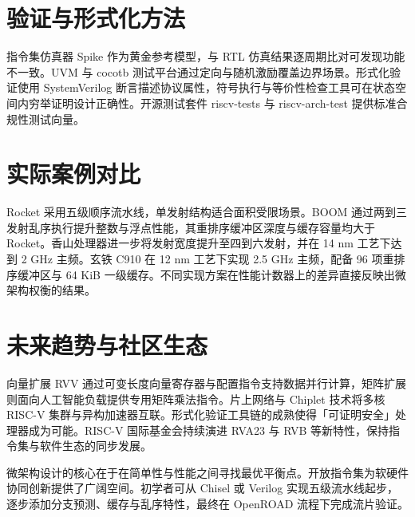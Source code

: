 \chapter{验证与形式化方法}
指令集仿真器 Spike 作为黄金参考模型，与 RTL 仿真结果逐周期比对可发现功能不一致。UVM 与 cocotb 测试平台通过定向与随机激励覆盖边界场景。形式化验证使用 SystemVerilog 断言描述协议属性，符号执行与等价性检查工具可在状态空间内穷举证明设计正确性。开源测试套件 riscv-tests 与 riscv-arch-test 提供标准合规性测试向量。\par
\chapter{实际案例对比}
Rocket 采用五级顺序流水线，单发射结构适合面积受限场景。BOOM 通过两到三发射乱序执行提升整数与浮点性能，其重排序缓冲区深度与缓存容量均大于 Rocket。香山处理器进一步将发射宽度提升至四到六发射，并在 14 nm 工艺下达到 2 GHz 主频。玄铁 C910 在 12 nm 工艺下实现 2.5 GHz 主频，配备 96 项重排序缓冲区与 64 KiB 一级缓存。不同实现方案在性能计数器上的差异直接反映出微架构权衡的结果。\par
\chapter{未来趋势与社区生态}
向量扩展 RVV 通过可变长度向量寄存器与配置指令支持数据并行计算，矩阵扩展则面向人工智能负载提供专用矩阵乘法指令。片上网络与 Chiplet 技术将多核 RISC-V 集群与异构加速器互联。形式化验证工具链的成熟使得「可证明安全」处理器成为可能。RISC-V 国际基金会持续演进 RVA23 与 RVB 等新特性，保持指令集与软件生态的同步发展。\par
微架构设计的核心在于在简单性与性能之间寻找最优平衡点。开放指令集为软硬件协同创新提供了广阔空间。初学者可从 Chisel 或 Verilog 实现五级流水线起步，逐步添加分支预测、缓存与乱序特性，最终在 OpenROAD 流程下完成流片验证。\par
